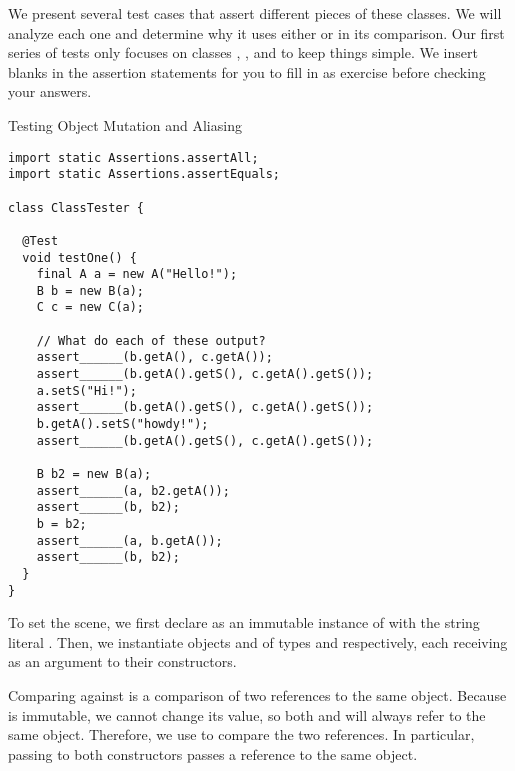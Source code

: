 
We present several test cases that assert different pieces of these classes. We will analyze each one and determine why it uses either  or  in its comparison. Our first series of tests only focuses on classes , , and  to keep things simple. We insert blanks in the assertion statements for you to fill in as exercise before checking your answers.

\begin{cl}{Testing Object Mutation and Aliasing}
\begin{lstlisting}[language=MyJava]
import static Assertions.assertAll;
import static Assertions.assertEquals;

class ClassTester {

  @Test
  void testOne() {
    final A a = new A("Hello!");
    B b = new B(a);
    C c = new C(a);

    // What do each of these output?
    assert______(b.getA(), c.getA());
    assert______(b.getA().getS(), c.getA().getS());
    a.setS("Hi!");
    assert______(b.getA().getS(), c.getA().getS());
    b.getA().setS("howdy!");
    assert______(b.getA().getS(), c.getA().getS());

    B b2 = new B(a);
    assert______(a, b2.getA());
    assert______(b, b2);
    b = b2;
    assert______(a, b.getA());
    assert______(b, b2);
  }
}
\end{lstlisting}
\end{cl}

To set the scene, we first declare  as an immutable instance of  with the string literal . Then, we instantiate objects  and  of types  and  respectively, each receiving  as an argument to their constructors. 

Comparing  against  is a comparison of two references to the same object. Because  is immutable, we cannot change its value, so both  and  will always refer to the same object. Therefore, we use  to compare the two references. In particular, passing  to both constructors passes a reference to the same object.

